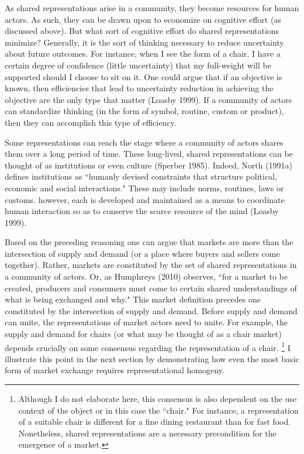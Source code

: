 As shared representations arise in a community, they become resources for human actors. As such, they can be drawn upon to economize on cognitive effort (as discussed above). But what sort of cognitive effort do shared representations minimize? Generally, it is the sort of thinking necessary to reduce uncertainty about future outcomes. For instance, when I see the form of a chair, I have a certain degree of confidence (little uncertainty) that my full-weight will be supported should I choose to sit on it. One could argue that if an objective is known, then efficiencies that lead to uncertainty reduction in achieving the objective are the only type that matter (Loasby 1999). If a community of actors can standardize thinking (in the form of symbol, routine, custom or product), then they can accomplish this type of efficiency. 

Some representations can reach the stage where a community of actors shares them over a long period of time. These long-lived, shared representations can be thought of as institutions or even culture (Sperber 1985). Indeed, North (1991a) defines institutions as ``humanly devised constraints that structure political, economic and social interactions."  These may include norms, routines, laws or customs. however, each is developed and maintained as a means to coordinate human interaction so as to conserve the scarce resource of the mind (Loasby 1999). 

Based on the preceding reasoning one can argue that markets are more than the intersection of supply and demand (or a place where buyers and sellers come together).  Rather, markets are constituted by the set of shared representations in a community of actors. Or, as Humphreys (2010) observes, ``for a market to be created, producers and consumers must come to certain shared understandings of what is being exchanged and why." This market definition precedes one constituted by the intersection of supply and demand. Before supply and demand can unite, the representations of market actors need to unite. For example, the supply and demand for chairs (or what may be thought of as a chair market) depends crucially on some consensus regarding the representation of a chair. \footnote{Although I do not elaborate here, this consensus is also dependent on the use context of the object or in this case the ``chair." For instance, a representation of a suitable chair is different for a fine dining restaurant than for fast food. Nonetheless, shared representations are a necessary precondition for the emergence of a market.} I illustrate this point in the next section by demonstrating how even the most basic form of market exchange requires representational homogeny. 

